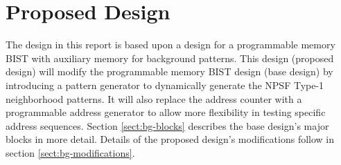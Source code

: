 \chapter{Proposed Design}
\label{chap:design}

The design in this report is based upon a design\cite{1584083} for a programmable memory BIST with auxiliary memory for background patterns.  This design (proposed design) will modify the programmable memory BIST design (base design) by introducing a pattern generator to dynamically generate the NPSF Type-1 neighborhood patterns.  It will also replace the address counter with a programmable address generator to allow more flexibility in testing specific address sequences.  Section \ref{sect:bg-blocks} describes the base design's major blocks in more detail.  Details of the proposed design's modifications follow in section \ref{sect:bg-modifications}.





